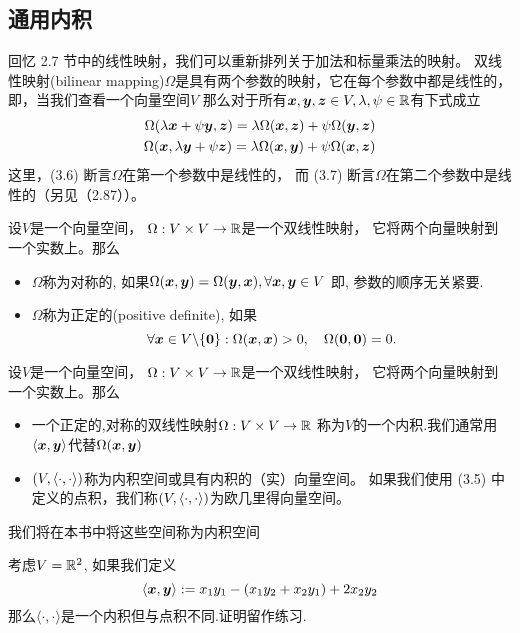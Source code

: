 \subsection{通用内积}
回忆 2.7 节中的线性映射，我们可以重新排列关于加法和标量乘法的映射。
双线性映射(bilinear mapping)$\Omega$是具有两个参数的映射，它在每个参数中都是线性的，
即，当我们查看一个向量空间$V$
那么对于所有$\boldsymbol{x},\boldsymbol{y},\boldsymbol{z} \in V, \lambda, \psi \in \mathbb{R}$有下式成立
\begin{align}
    \Omega(\lambda\boldsymbol{x} + \psi\boldsymbol{y},\boldsymbol{z}) = \lambda\Omega(\boldsymbol{x},\boldsymbol{z}) + \psi\Omega(\boldsymbol{y},\boldsymbol{z}) \\
    \Omega(\boldsymbol{x},\lambda\boldsymbol{y} + \psi\boldsymbol{z}) = \lambda\Omega(\boldsymbol{x},\boldsymbol{y}) + \psi\Omega(\boldsymbol{x},\boldsymbol{z})
\end{align}
这里，(3.6) 断言$\Omega$在第一个参数中是线性的，
而 (3.7) 断言$\Omega$在第二个参数中是线性的（另见（2.87））。
\begin{definition}
    设$V$是一个向量空间，
    $\Omega : V \times V \rightarrow \mathbb{R}$是一个双线性映射，
    它将两个向量映射到一个实数上。那么
    \begin{itemize}
        \item $\Omega$称为对称的,
              如果$\Omega(\boldsymbol{x},\boldsymbol{y}) = \Omega(\boldsymbol{y},\boldsymbol{x}), \forall \boldsymbol{x},\boldsymbol{y} \in V$
              即, 参数的顺序无关紧要.
        \item $\Omega$称为正定的(positive definite), 如果
        \begin{equation}
            \forall \boldsymbol{x} \in V\backslash\{\boldsymbol{0}\}:\Omega(\boldsymbol{x},\boldsymbol{x}) > 0,
            \quad \Omega(\boldsymbol{0},\boldsymbol{0}) = 0.
        \end{equation}
    \end{itemize}
\end{definition}
\begin{definition}
    设$V$是一个向量空间，
    $\Omega : V \times V \rightarrow \mathbb{R}$是一个双线性映射，
    它将两个向量映射到一个实数上。那么
    \begin{itemize}
        \item 一个正定的,对称的双线性映射$\Omega:V \times V \rightarrow \mathbb{R}$
              称为$V$的一个内积.我们通常用$\left\langle\boldsymbol{x},\boldsymbol{y}\right\rangle$代替$\Omega(\boldsymbol{x},\boldsymbol{y})$
        \item $(V, \left\langle\cdot,\cdot\right\rangle)$称为内积空间或具有内积的（实）向量空间。
              如果我们使用 (3.5) 中定义的点积，我们称$(V, \left\langle\cdot,\cdot\right\rangle)$为欧几里得向量空间。
    \end{itemize}
\end{definition}
我们将在本书中将这些空间称为内积空间
\begin{example}
    考虑$V = \mathbb{R}^2$, 如果我们定义
    \begin{equation}
        \langle\boldsymbol{x},\boldsymbol{y}\rangle := x_1y_1 - (x_1y_2 + x_2y_1) + 2x_2y_2
    \end{equation}
    那么$\langle\cdot,\cdot\rangle$是一个内积但与点积不同.证明留作练习.
\end{example}

